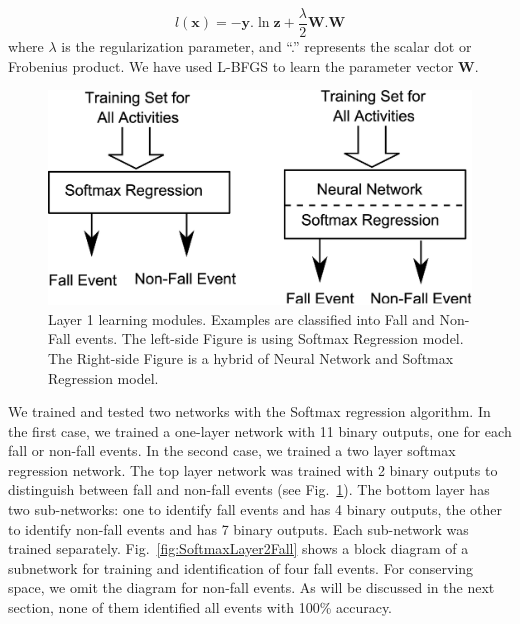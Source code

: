 \documentclass[]{IEEEtran}
\begin{document}
\begin{equation} 
l(\mathbf{x}) = -\mathbf{y}.\ln \mathbf{z} + \frac{\lambda}{2} \mathbf{W}.\mathbf{W}
\label{eq:objective-function}
\end{equation}
 where  $\lambda$ is the regularization parameter, and ``.'' represents the scalar dot  
or Frobenius product.
 We have used L-BFGS \cite{DBLP:conf/icml/LeNCLPN11} to learn the 
parameter vector $\mathbf{W}$.  

\begin{figure}[htbp]
	\centering
		\includegraphics[width=0.98\columnwidth]{figures/SoftmaxLayer1.eps}
	\caption{Layer 1 learning modules. Examples are classified into Fall and Non-Fall events.  The left-side Figure is using Softmax Regression model. The Right-side Figure is a hybrid of Neural Network and Softmax Regression model.}
	\label{fig:SoftmaxLayer1}
\end{figure}

We trained and tested two networks with the Softmax regression algorithm. In the first case, we trained a one-layer network with 11 binary outputs, one for each fall or non-fall events. In the second case, we trained a two layer softmax regression network. The top layer network was trained with 2 binary outputs to distinguish between fall and non-fall events (see Fig.~\ref{fig:SoftmaxLayer1}). The bottom layer has two sub-networks:  one to identify fall events and has 4 binary outputs, the other to identify non-fall events and has 7 binary outputs. Each sub-network was trained separately. Fig.~\ref{fig:SoftmaxLayer2Fall} shows a block diagram of a subnetwork for training and identification of four fall events. For conserving space, we omit the diagram for non-fall events. As will be discussed in the next section, none of them identified all events with 100\% accuracy.
\end{document}
